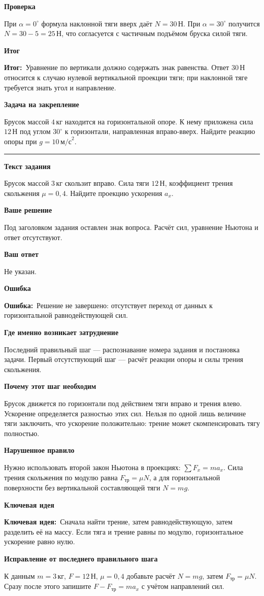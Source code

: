 \documentclass[a4paper,12pt]{article}
\newcommand{\reviewtitle}[1]{\noindent{\Large\bfseries\color{deepaccent}Задание №#1}\par\vspace{2mm}\noindent\rule{\linewidth}{0.35pt}\vspace{2mm}}
\newcommand{\subblock}[1]{\par\medskip\textbf{\color{deepaccent}#1}\par\vspace{-2pt}}
\newcommand{\errorlabel}{\textcolor{errorred}{\textbf{Ошибка:}}}
\newcommand{\keyidea}{\textcolor{ideablue}{\textbf{Ключевая идея:}}}
\newcommand{\resultlabel}{\textcolor{deepaccent}{\textbf{Итог:}}}
\begin{document}
\subblock{Проверка}
При $\alpha=0^\circ$ формула наклонной тяги вверх даёт $N=30\,\text{Н}$. При $\alpha=30^\circ$ получится $N=30-5=25\,\text{Н}$, что согласуется с частичным подъёмом бруска силой тяги.

\subblock{Итог}
\resultlabel\ Уравнение по вертикали должно содержать знак равенства. Ответ $30\,\text{Н}$ относится к случаю нулевой вертикальной проекции тяги; при наклонной тяге требуется знать угол и направление.

\subblock{Задача на закрепление}
Брусок массой $4\,\text{кг}$ находится на горизонтальной опоре. К нему приложена сила $12\,\text{Н}$ под углом $30^\circ$ к горизонтали, направленная вправо-вверх. Найдите реакцию опоры при $g=10\,\text{м/с}^2$.

\clearpage
{}\label{task:7}
\reviewtitle{7}
\subblock{Текст задания}
Брусок массой $3\,\text{кг}$ скользит вправо. Сила тяги $12\,\text{Н}$, коэффициент трения скольжения $\mu=0{,}4$. Найдите проекцию ускорения $a_x$.

\subblock{Ваше решение}
Под заголовком задания оставлен знак вопроса. Расчёт сил, уравнение Ньютона и ответ отсутствуют.

\subblock{Ваш ответ}
Не указан.

\subblock{Ошибка}
\errorlabel\ Решение не завершено: отсутствует переход от данных к горизонтальной равнодействующей сил.

\subblock{Где именно возникает затруднение}
Последний правильный шаг --- распознавание номера задания и постановка задачи. Первый отсутствующий шаг --- расчёт реакции опоры и силы трения скольжения.

\subblock{Почему этот шаг необходим}
Брусок движется по горизонтали под действием тяги вправо и трения влево. Ускорение определяется разностью этих сил. Нельзя по одной лишь величине тяги заключить, что ускорение положительно: трение может скомпенсировать тягу полностью.

\subblock{Нарушенное правило}
Нужно использовать второй закон Ньютона в проекциях: $\sum F_x=ma_x$. Сила трения скольжения по модулю равна $F_{\text{тр}}=\mu N$, а для горизонтальной поверхности без вертикальной составляющей тяги $N=mg$.

\subblock{Ключевая идея}
\keyidea\ Сначала найти трение, затем равнодействующую, затем разделить её на массу. Если тяга и трение равны по модулю, горизонтальное ускорение равно нулю.

\subblock{Исправление от последнего правильного шага}
К данным $m=3\,\text{кг}$, $F=12\,\text{Н}$, $\mu=0{,}4$ добавьте расчёт $N=mg$, затем $F_{\text{тр}}=\mu N$. Сразу после этого запишите $F-F_{\text{тр}}=ma_x$ с учётом направлений сил.
\end{document}
